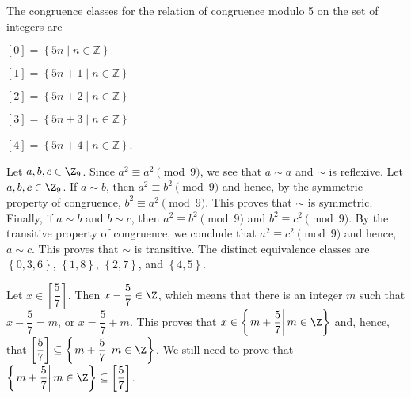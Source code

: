 \begin{list}{\bf{\ref{exer:sec73-congclass}.}}
\item The congruence classes for the relation of congruence modulo 5 on the set of integers are

\begin{multicols}{2}$\left[ 0 \right] = \left\{ 5n \mid n \in \mathbb{Z} \right\}$

$\left[ 1 \right] = \left\{ 5n +1 \mid n \in \mathbb{Z} \right\}$

$\left[ 2 \right] = \left\{ 5n + 2 \mid n \in \mathbb{Z} \right\}$

$\left[ 3 \right] = \left\{ 5n + 3 \mid n \in \mathbb{Z} \right\}$

$\left[ 4 \right] = \left\{ 5n + 4 \mid n \in \mathbb{Z} \right\}$.
\end{multicols}
\end{list}


\begin{list}{\bf{\ref{exer:modpowers}.}}
\item \begin{list}{\bf{(a)}}
\item Let $a, b, c \in \Z_9$.  Since $a^2 \equiv a^2 \pmod 9$, we see that $a \sim a$ and $\sim$ is reflexive.  Let $a, b, c \in \Z_9$.  If $a \sim b$, then $a^2 \equiv b^2 \pmod 9$ and hence, by the symmetric property of congruence, $b^2 \equiv a^2 \pmod 9$.  This proves that $\sim$ is symmetric.  Finally, if $a \sim b$ and $b \sim c$, then 
$a^2 \equiv b^2 \pmod 9$ and $b^2 \equiv c^2 \pmod 9$.  By the transitive property of congruence, we conclude that $a^2 \equiv c^2 \pmod 9$ and hence, $a \sim c$.  This proves that $\sim$ is transitive.  The distinct equivalence classes are $\left\{0, 3, 6 \right\}$, $\left\{1, 8 \right\}$, 
$\left\{ 2, 7 \right\}$, and $\left\{ 4, 5 \right\}$.
\end{list}
\end{list}


\begin{list}{\bf{\ref{exer:sec73-integer}.}}
\item \begin{list}{\bf{(a)}}
\item Let $x \in \left[ \dfrac{5}{7} \right]$.  Then $x - \dfrac{5}{7} \in \Z$, which means that there is an integer $m$ such that $x - \dfrac{5}{7} = m$, or $x = \dfrac{5}{7} + m$.  This proves that \linebreak
$x \in \left\{ \left. m + \dfrac{5}{7} \right| m \in \Z \right\}$ and, hence, that
$\left[ \dfrac{5}{7} \right] \subseteq \left\{ \left. m + \dfrac{5}{7} \right| m \in \Z \right\}$.  We still need to prove that 
$\left\{ \left. m + \dfrac{5}{7} \right| m \in \Z \right\} \subseteq \left[ \dfrac{5}{7} \right]$.
\end{list}
\end{list}


